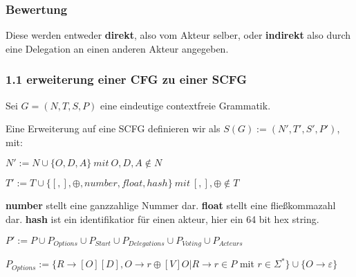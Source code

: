 \documentclass[]{article}
\begin{document}
\subsubsection{Bewertung}
Diese werden entweder \textbf{direkt}, also vom Akteur selber, oder \textbf{indirekt} also durch eine Delegation an einen anderen Akteur angegeben.
% 
% 
% 
% 
% 
% 

\subsubsection{1.1 erweiterung einer CFG zu einer SCFG}

Sei $G = (N,T,S,P)$ eine eindeutige contextfreie Grammatik.

Eine Erweiterung auf eine SCFG definieren wir als
$S(G) := (N',T',S',P')$, mit:

$N' := N \cup \{O,D,A\}\ mit\ O,D,A\notin N$

$T' := T \cup \{[ , ], \oplus, number, float, hash \}\ mit\ [,],\oplus \notin T$

\textbf{number} stellt eine ganzzahlige Nummer dar. \textbf{float}
stellt eine fließkommazahl dar. \textbf{hash} ist ein identifikatior für
einen akteur, hier ein 64 bit hex string.

$P' := P\cup P_{Options} \cup P_{Start} \cup P_{Delegations} \cup P_{Voting} \cup P_{Acteurs}$

$P_{Options} := \{R \rightarrow [O][D], O \rightarrow r\oplus [V] O \vert R\rightarrow r\in P$
mit $r\in\Sigma^*\}\cup\{ O \rightarrow \varepsilon \}$
\end{document}
